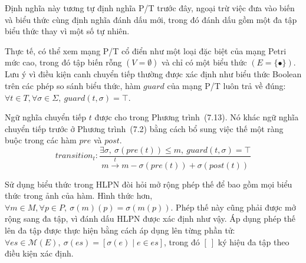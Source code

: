 Định nghĩa này tương tự định nghĩa P/T trước đây, ngoại trừ việc đưa vào biến và biểu thức cùng định nghĩa đánh dấu mới, trong đó đánh dấu gồm một đa tập biểu thức thay vì một số tự nhiên.

Thực tế, có thể xem mạng P/T cổ điển như một loại đặc biệt của mạng Petri mức cao, trong đó tập biến rỗng $(V=\emptyset)$ và chỉ có một biểu thức $(E=\{\bullet\})$. Lưu ý vì điều kiện canh chuyển tiếp thường được xác định như biểu thức Boolean trên các phép so sánh biểu thức, hàm $guard$ của mạng P/T luôn trả về đúng: $\forall t\in T,\forall\sigma\in\Sigma,\ guard(t,\sigma)=\top$.

Ngữ nghĩa chuyển tiếp $t$ được cho trong Phương trình~(7.13). Nó khác ngữ nghĩa chuyển tiếp trước ở Phương trình~(7.2) bằng cách bổ sung việc thế một ràng buộc trong các hàm $pre$ và $post$.
\begin{equation}
transition_t:\frac{\exists\sigma,\ \sigma(pre(t))\leqslant m,\ guard(t,\sigma)=\top}{m\xrightarrow{t}m-\sigma(pre(t))+\sigma(post(t))}\tag{7.13}
\end{equation}

Sử dụng biểu thức trong HLPN đòi hỏi mở rộng phép thế để bao gồm mọi biểu thức trong ảnh của hàm. Hình thức hơn, $\forall m\in M,\forall p\in P,\ \sigma(m)(p)=\sigma(m(p))$. Phép thế này cũng phải được mở rộng sang đa tập, vì đánh dấu HLPN được xác định như vậy. Áp dụng phép thế lên đa tập được thực hiện bằng cách áp dụng lên từng phần tử: $\forall es\in\mathcal{M}(E),\ \sigma(es)=[\sigma(e)\mid e\in es]$, trong đó $[\ ]$ ký hiệu đa tập theo điều kiện xác định.


